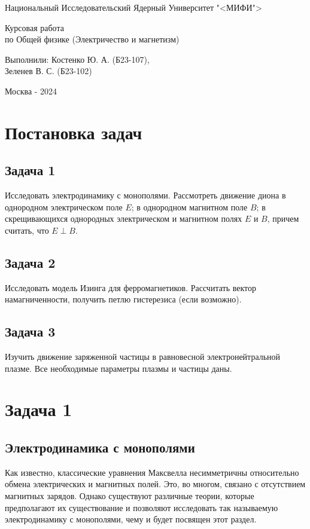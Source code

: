 \documentclass[oneside,final,14pt]{extarticle}
\begin{document}
	\begin{titlepage}
		\centerline{Национальный Исследовательский Ядерный Университет "<МИФИ">}
		\vfill
		\Large
		\begin{center}
			Курсовая работа\\ по Общей физике (Электричество и магнетизм)
		\end{center}
		\normalsize
		\vfill
		\begin{flushright}
			Выполнили: Костенко Ю. А. (Б23-107), \\ Зеленев В. С. (Б23-102)
		\end{flushright}
		\vfill \vfill \vfill
		\centerline{Москва - 2024}
	\end{titlepage}
	\setcounter{page}{2}
	\tableofcontents
	\newpage
	
	\section{Постановка задач}
	\subsection{Задача 1}
	Исследовать электродинамику с монополями. Рассмотреть движение диона в однородном электрическом поле $E$; в однородном магнитном поле $B$; в скрещивающихся однородных электрическом и магнитном полях $E$ и $B$, причем считать, что $E \perp B$.
	\subsection{Задача 2}
	Исследовать модель Изинга для ферромагнетиков. Рассчитать вектор намагниченности, получить петлю гистерезиса (если возможно). 
	\subsection{Задача 3}
	Изучить движение заряженной частицы в равновесной электронейтральной плазме. Все необходимые параметры плазмы и частицы даны. 
	\newpage
	
	\section{Задача 1}
	\subsection{Электродинамика с монополями}
	Как известно, классические уравнения Максвелла несимметричны относительно обмена электрических и магнитных полей. Это, во многом, связано с отсутствием магнитных зарядов. Однако существуют различные теории, которые предполагают их существование и позволяют исследовать так называемую электродинамику с монополями, чему и будет посвящен этот раздел. 
	
\end{document}
